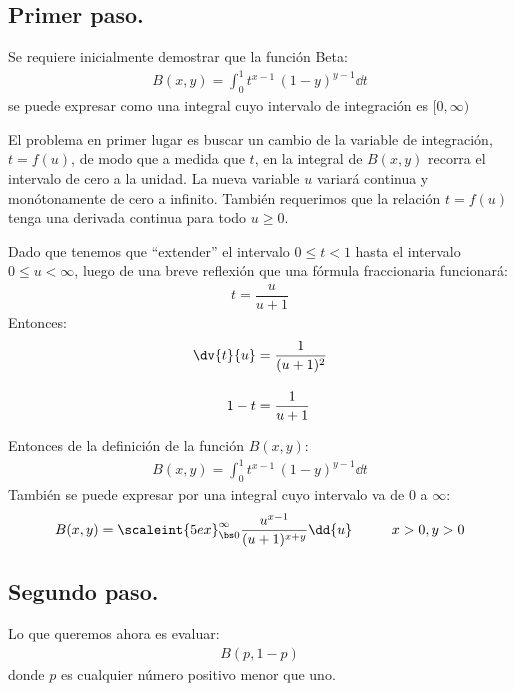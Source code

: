 \subsection{Primer paso.}

Se requiere inicialmente demostrar que la función Beta:
\begin{align*}
B(x, y) = \int_{0}^{1} t^{x - 1} \, (1 - y)^{y-1} \dd{t}
\end{align*}
se puede expresar como una integral cuyo intervalo de integración es $[0, \infty)$
\par
El problema en primer lugar es buscar un cambio de la variable de integración,  $t = f(u)$,  de modo que a medida que $t$, en la integral de $B (x, y)$ recorra el intervalo de cero a la unidad. La nueva variable $u$ variará continua y monótonamente de cero a infinito. También requerimos que la relación $t = f(u)$ tenga una derivada continua para todo $u \geq 0$.
\par
Dado que tenemos que \enquote{extender} el intervalo $0 \leq t < 1$ hasta el intervalo $0 \leq u < \infty$,  luego de una breve reflexión que una fórmula fraccionaria funcionará:
\begin{align*}
t = \dfrac{u}{u + 1}
\end{align*}
Entonces:
\begin{align*}
\dv{t}{u} &= \dfrac{1}{(u + 1)^{2}} \\[1em] 
1 - t &= \dfrac{1}{u + 1}
\end{align*}

Entonces de la definición de la función $B(x, y)$:
\begin{align*}
B(x, y) = \int_{0}^{1} t^{x - 1} \, (1 - y)^{y-1} \dd{t}
\end{align*}
También se puede expresar por una integral cuyo intervalo va de $0$ a  $\infty$:
\begin{align*}
B(x, y) = \scaleint{5ex}_{\bs 0}^{\infty} \dfrac{u^{x-1}}{(u + 1)^{x+y}} \dd{u} \hspace{1cm} x > 0, y > 0
\end{align*}

\subsection{Segundo paso.}

Lo que queremos ahora es evaluar:
\begin{align*}
B(p, 1 - p)
\end{align*}
donde $p$ es cualquier número positivo menor que uno.


